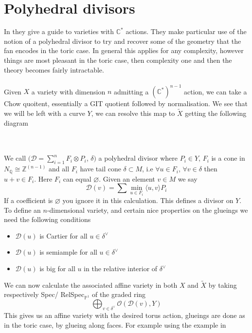 \documentclass[11pt]{report}
\theoremstyle{definition}
\theoremstyle{definition}
\theoremstyle{definition}
\theoremstyle{definition}
\theoremstyle{definition}
\theoremstyle{definition}
\theoremstyle{definition}
\begin{document}
\section{Polyhedral divisors}
In \cite{Altmann} they give a guide to varieties with $\mathbb{C}^*$ actions. They make particular use of the notion of a polyhedral divisor to try and recover some of the geometry that the fan encodes in the toric case. In general this applies for any complexity, however things are most pleasant in the toric case, then complexity one and then the theory becomes fairly intractable. 
\\
\\
Given $X$ a variety with dimension $n$ admitting a $(\mathbb{C}^*)^{n-1}$ action, we can take a Chow quoitent, essentially a GIT quotient followed by normalisation. We see that we will be left with a curve $Y$, we can resolve this map to $\tilde{X}$ getting the following diagram
\\
\\
\\
We call $(\mathcal{D} = \sum_{i = 1}^n F_i \otimes P_i$, $\delta)$ a polyhedral divisor where $P_i \in Y$, $F_i$ is a cone in $N_\mathbb{Q} \cong \mathbb{Z}^{(n-1)}$ and all $F_i$ have tail cone $\delta \subset M$, i.e  $\forall u \in F_i$, $ \forall v \in \delta$ then $u+v \in F_i$. Here $F_i$ can equal $\varnothing$. Given an element $v \in M$ we say 
\[
\mathcal{D}(v) = \sum \min_{u \in F_i} \langle u, v \rangle P_i
\]
If a coefficient is $\varnothing$ you ignore it in this calculation.
This defines a divisor on $Y$. To define an $n$-dimensional variety, and certain nice properties on the glueings we need the following conditions \cite{PS}
\begin{itemize} 
\item $\mathcal{D}(u)$ is Cartier for all $u \in \delta^\vee $
\item $\mathcal{D}(u)$ is semiample for all $u \in \delta^\vee$
\item $\mathcal{D}(u)$ is big for all $u$ in the relative interior of $\delta^\vee$
\end{itemize}
We can now calculate the associated affine variety in both $X$ and $\tilde{X}$ by taking respectively Spec/ RelSpec${_{\mathbb{P}^1}}$ of the graded ring
\[
\bigoplus_{v \in \delta^\vee} \mathcal{O}( \mathcal{D}(v), Y) 
\]
This gives us an affine variety with the desired torus action, glueings are done as in the toric case, by glueing along faces. For example using the example in \cite{PS}
\end{document}
